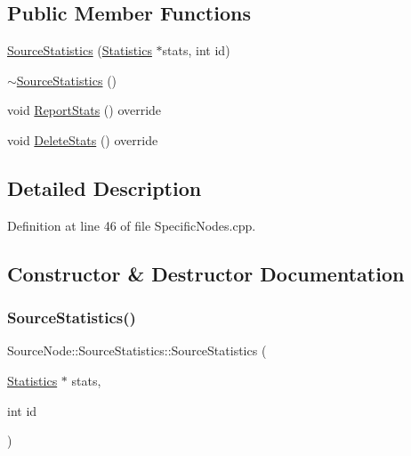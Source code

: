 \subsection*{Public Member Functions}
\begin{DoxyCompactItemize}
\item 
\hyperlink{class_source_node_1_1_source_statistics_af5937405e6bab20019890cb928debec0}{Source\+Statistics} (\hyperlink{class_generic_node_1_1_statistics}{Statistics} $\ast$stats, int id)
\item 
\hyperlink{class_source_node_1_1_source_statistics_a84b02b881b9f358f5bf810c698a20016}{$\sim$\+Source\+Statistics} ()
\item 
void \hyperlink{class_source_node_1_1_source_statistics_a413fa2c8297a18c1dfb509312ee19b3d}{Report\+Stats} () override
\item 
void \hyperlink{class_source_node_1_1_source_statistics_ab81983e0a060fe47cd8020636bb71648}{Delete\+Stats} () override
\end{DoxyCompactItemize}


\subsection{Detailed Description}


Definition at line 46 of file Specific\+Nodes.\+cpp.



\subsection{Constructor \& Destructor Documentation}
\mbox{\label{class_source_node_1_1_source_statistics_af5937405e6bab20019890cb928debec0}} 
\subsubsection{\texorpdfstring{Source\+Statistics()}{SourceStatistics()}}
{\footnotesize\ttfamily Source\+Node\+::\+Source\+Statistics\+::\+Source\+Statistics (\begin{DoxyParamCaption}\item[{\hyperlink{class_generic_node_1_1_statistics}{Statistics} $\ast$}]{stats,  }\item[{int}]{id }\end{DoxyParamCaption})\hspace{0.3cm}{\ttfamily [inline]}}



